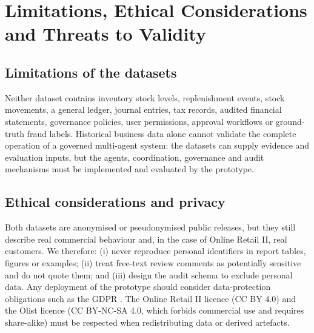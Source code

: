 \documentclass[11pt,a4paper]{article}
\begin{document}
\section{Limitations, Ethical Considerations and Threats to Validity}
\subsection*{Limitations of the datasets}
Neither dataset contains inventory stock levels, replenishment events, stock movements, a general ledger, journal entries, tax records, audited financial statements, governance policies, user permissions, approval workflows or ground-truth fraud labels. Historical business data alone cannot validate the complete operation of a governed multi-agent system: the datasets can supply evidence and evaluation inputs, but the agents, coordination, governance and audit mechanisms must be implemented and evaluated by the prototype.

\subsection*{Ethical considerations and privacy}
Both datasets are anonymised or pseudonymised public releases, but they still describe real commercial behaviour and, in the case of Online Retail II, real customers. We therefore: (i) never reproduce personal identifiers in report tables, figures or examples; (ii) treat free-text review comments as potentially sensitive and do not quote them; and (iii) design the audit schema to exclude personal data. Any deployment of the prototype should consider data-protection obligations such as the GDPR \cite{gdpr2016}. The Online Retail II licence (CC BY 4.0) and the Olist licence (CC BY-NC-SA 4.0, which forbids commercial use and requires share-alike) must be respected when redistributing data or derived artefacts.
\end{document}
